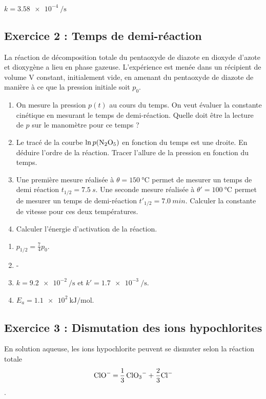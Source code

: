  $k = \SI{3.58e-4}{\per\second}$

\subsection{Exercice 2 : Temps de demi-réaction}

La réaction de décomposition totale du pentaoxyde de diazote  en dioxyde d'azote  et dioxygène a lieu en phase gazeuse. L’expérience est menée dans un récipient de volume V constant, initialement vide, en amenant du pentaoxyde de diazote de manière à ce que la pression initiale soit $p_0$.

\begin{enumerate}
	\item On mesure la pression $p(t)$ au cours du temps. On veut évaluer la constante cinétique en mesurant le temps de demi-réaction. Quelle doit être la lecture de $p$ sur le manomètre pour ce temps ?
	\item Le tracé de la courbe $\ln{p(\ce{N2O5})}$ en fonction du temps est une droite. En déduire l'ordre de la réaction. Tracer l'allure de la pression en fonction du temps.
	\item Une première mesure réalisée à $\theta = \SI{150}{\celsius}$ permet de mesurer un temps de demi réaction $t_{1/2} = \SI{7.5}{s}$. Une seconde mesure réalisée à $\theta' = \SI{100}{\celsius}$ permet de mesurer un temps de demi-réaction $t'_{1/2} = \SI{7.0}{min}$. Calculer la constante de vitesse pour ces deux températures.
	\item Calculer l'énergie d'activation de la réaction.
\end{enumerate}

\begin{enumerate}
	\item $p_{1/2} = \frac{7}{4}p_0$.
	\item -
	\item $k = \SI{9.2e-2}{\per\second}$ et $k' = \SI{1.7e-3}{\per\second}$.
	\item $E_a = \SI{1.1e2}{\kilo\joule\per\mol}$.
\end{enumerate}

\subsection{Exercice 3 : Dismutation des ions hypochlorites}

En solution aqueuse, les ions hypochlorite  peuvent se dismuter selon la réaction totale $$\ce{ClO- = \frac{1}{3} ClO3- + \frac{2}{3}Cl-}$$.

